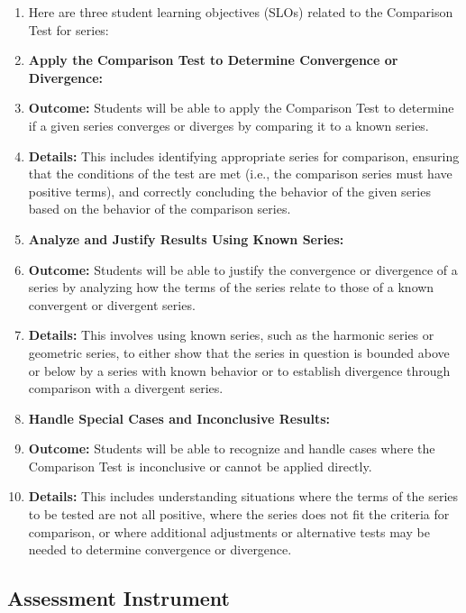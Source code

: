 \begin{enumerate}
    \item Here are three student learning objectives (SLOs) related to the Comparison Test for series:
    \item \textbf{Apply the Comparison Test to Determine Convergence or Divergence:}
    \item \textbf{Outcome:} Students will be able to apply the Comparison Test to determine if a given series converges or diverges by comparing it to a known series.
    \item \textbf{Details:} This includes identifying appropriate series for comparison, ensuring that the conditions of the test are met (i.e., the comparison series must have positive terms), and correctly concluding the behavior of the given series based on the behavior of the comparison series.
    \item \textbf{Analyze and Justify Results Using Known Series:}
    \item \textbf{Outcome:} Students will be able to justify the convergence or divergence of a series by analyzing how the terms of the series relate to those of a known convergent or divergent series.
    \item \textbf{Details:} This involves using known series, such as the harmonic series or geometric series, to either show that the series in question is bounded above or below by a series with known behavior or to establish divergence through comparison with a divergent series.
    \item \textbf{Handle Special Cases and Inconclusive Results:}
    \item \textbf{Outcome:} Students will be able to recognize and handle cases where the Comparison Test is inconclusive or cannot be applied directly.
    \item \textbf{Details:} This includes understanding situations where the terms of the series to be tested are not all positive, where the series does not fit the criteria for comparison, or where additional adjustments or alternative tests may be needed to determine convergence or divergence.
\end{enumerate}

\subsection{Assessment Instrument}

